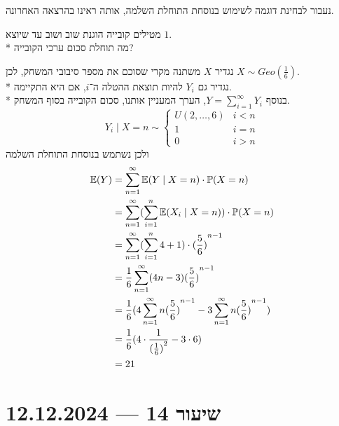 נעבור לבחינת דוגמה לשימוש בנוסחת התוחלת השלמה, אותה ראינו בהרצאה האחרונה.
\begin{exercise}
	מטילים קובייה הוגנת שוב ושוב עד שיוצא $1$. \\*
	מה תוחלת סכום ערכי הקובייה?
\end{exercise}
\begin{solution}
	נגדיר $X$ משתנה מקרי שסוכם את מספר סיבובי המשחק, לכן $X \sim Geo(\frac{1}{6})$. \\*
	נגדיר גם $Y_i$ להיות תוצאת ההטלה ה־$i$, אם היא התקיימה. \\*
	בנוסף $Y = \sum_{i = 1}^{\infty} Y_i$, הערך המעניין אותנו, סכום הקובייה בסוף המשחק.
	\[
		Y_i \mid X = n
		\sim \begin{cases}
			U(2, \dots, 6) & i < n \\
			1 & i = n \\
			0 & i > n
		\end{cases}
	\]
	ולכן נשתמש בנוסחת התוחלת השלמה
	\begin{align*}
		\mathbb{E}(Y)
		& = \sum_{n = 1}^\infty \mathbb{E}(Y \mid X = n) \cdot \mathbb{P}(X = n) \\
		& = \sum_{n = 1}^\infty (\sum_{i = 1}^n \mathbb{E}(X_i \mid X = n)) \cdot \mathbb{P}(X = n) \\
		& = \sum_{n = 1}^\infty (\sum_{i = 1}^n 4 + 1) \cdot {(\frac{5}{6})}^{n - 1} \\
		& = \frac{1}{6} \sum_{n = 1}^\infty (4n - 3) {(\frac{5}{6})}^{n - 1} \\
		& = \frac{1}{6} (4 \sum_{n = 1}^\infty n {(\frac{5}{6})}^{n - 1} - 3 \sum_{n = 1}^\infty n {(\frac{5}{6})}^{n - 1}) \\
		& = \frac{1}{6} (4 \cdot \frac{1}{{(\frac{1}{6})}^2} - 3 \cdot 6) \\
		& = 21
	\end{align*}
\end{solution}

\section{שיעור 14 --- 12.12.2024}
